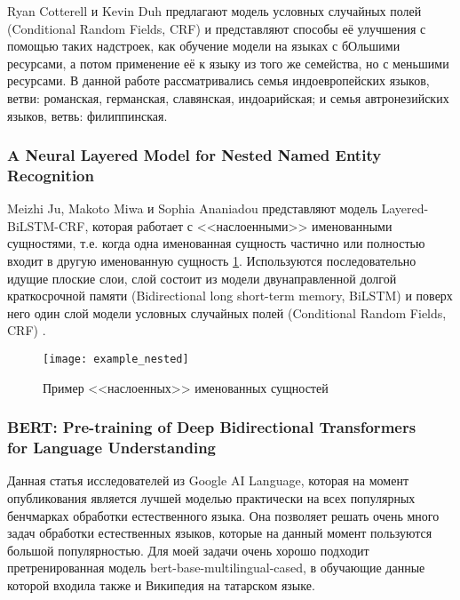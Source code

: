 Ryan Cotterell и Kevin Duh  \cite{cotterell-duh-2017-low} предлагают модель условных случайных полей (Conditional Random Fields, CRF) и представляют способы её улучшения с помощью таких надстроек, как обучение модели на языках с бОльшими ресурсами, а потом применение её к языку из того же семейства, но с меньшими ресурсами. В данной работе рассматривались семья индоевропейских языков, ветви: романская, германская, славянская, индоарийская; и семья автронезийских языков, ветвь: филиппинская.

\subsubsection{A Neural Layered Model for Nested Named Entity Recognition}

Meizhi Ju, Makoto Miwa и Sophia Ananiadou  \cite{ju-etal-2018-neural} представляют модель Layered-BiLSTM-CRF, которая работает с <<наслоенными>> именованными сущностями, т.е. когда одна именованная сущность частично или полностью входит в другую именованную сущность \ref{fig:example_nested}. Используются последовательно идущие плоские слои, слой состоит из модели двунаправленной долгой краткосрочной памяти (Bidirectional long short-term memory, BiLSTM) \cite{DBLP:journals/corr/GreffSKSS15} и поверх него один слой модели условных случайных полей (Conditional Random Fields, CRF) \cite{CRF}. 

\begin{figure}[h]
\caption{Пример <<наслоенных>> именованных сущностей}
\texttt{[image: example\_nested]}
\label{fig:example_nested}
\end{figure}


\subsubsection{BERT: Pre-training of Deep Bidirectional Transformers \\ for Language Understanding} 

Данная статья исследователей из Google AI Language\cite{DBLP:journals/corr/abs-1810-04805}, которая на момент опубликования является лучшей моделью практически на всех популярных бенчмарках обработки естественного языка. Она позволяет решать очень много задач обработки естественных языков, которые на данный момент пользуются большой популярностью. Для моей задачи очень хорошо подходит претренированная модель bert-base-multilingual-cased, в обучающие данные которой входила также и Википедия на татарском языке.

